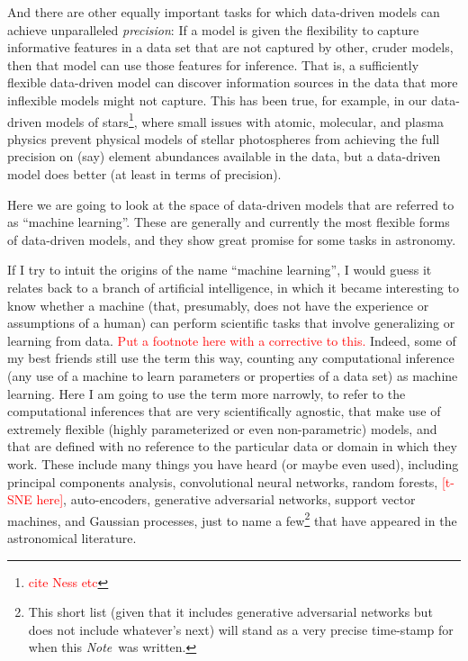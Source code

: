 \documentclass[12pt, twoside, letterpaper]{article}
\newcommand{\documentname}{\textsl{Note}}
\newcommand{\todo}[1]{\textcolor{red}{#1}}  %
\begin{document}
And there are other equally important tasks for which data-driven
models can achieve unparalleled \emph{precision}:
If a model is given the flexibility to capture informative features
in a data set that are not captured by other, cruder models, then that
model can use those features for inference.
That is, a sufficiently flexible data-driven model can discover information
sources in the data that more inflexible models might not capture.
This has been true, for example, in our data-driven models of stars\footnote{\todo{cite Ness etc}},
where small issues with atomic, molecular, and plasma physics prevent
physical models of stellar photospheres from achieving the full precision
on (say) element abundances available in the data, but a data-driven
model does better (at least in terms of precision).

Here we are going to look at the space of data-driven models that are
referred to as ``machine learning''.
These are generally and currently the most flexible forms of data-driven
models, and they show great promise for some tasks in astronomy.

If I try to intuit the origins of the name ``machine learning'',
I would guess it relates back to a branch of artificial intelligence,
in which it became interesting to know whether a machine (that,
presumably, does not have the experience or assumptions of a human)
can perform scientific tasks that involve generalizing or learning from
data. \todo{Put a footnote here with a corrective to this.}
Indeed, some of my best friends still use the term
this way, counting any computational inference (any use of a machine
to learn parameters or properties of a data set) as machine learning.
Here I am going to use the term more narrowly, to refer to the computational
inferences that are very scientifically agnostic, that make use of extremely
flexible (highly parameterized or even non-parametric) models, and
that are defined with no reference to the particular data or domain in
which they work.
These include many things you have heard (or maybe even used),
including principal components analysis, convolutional neural
networks, random forests, \todo{[t-SNE here]}, auto-encoders,
generative adversarial networks, support vector machines,
and Gaussian processes,
just to name a few\footnote{This short list (given
  that it includes generative adversarial networks but does not
  include whatever's next) will stand as a very precise time-stamp for
  when this \documentname\ was written.}
that have appeared in the astronomical literature.
\end{document}
